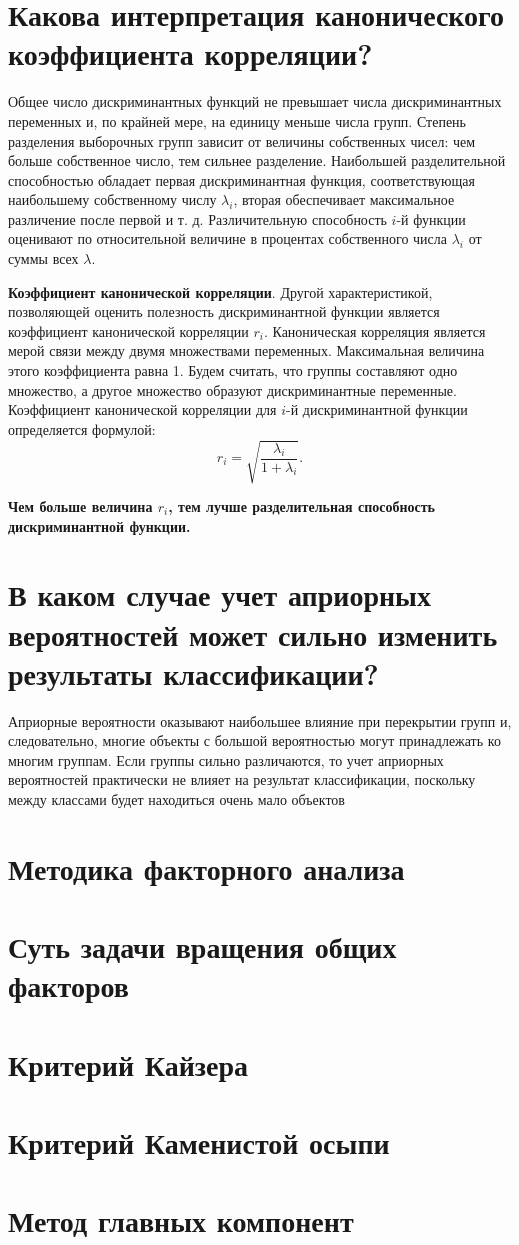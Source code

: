 \documentclass[a4paper, 12pt]{article}
\begin{document}
\section{Какова интерпретация канонического коэффициента корреляции?}
Общее число дискриминантных функций не превышает числа дискриминантных переменных и, по крайней мере, на единицу меньше числа групп. Степень разделения выборочных групп зависит от величины собственных чисел: чем больше собственное число, тем сильнее разделение. Наибольшей разделительной способностью обладает первая дискриминантная функция, соответствующая наибольшему собственному числу $\lambda_i$, вторая обеспечивает максимальное различение после первой и т. д. Различительную способность $i$-й функции оценивают по относительной величине в процентах собственного числа  $\lambda_i$ от суммы всех  $\lambda$.

\textbf{Коэффициент канонической корреляции}. Другой характеристикой, позволяющей оценить полезность дискриминантной функции является коэффициент канонической корреляции  $r_i$. Каноническая корреляция является мерой связи между двумя множествами переменных. Максимальная величина этого коэффициента равна 1. Будем считать, что группы составляют одно множество, а другое множество образуют дискриминантные переменные. Коэффициент канонической корреляции для $i$-й дискриминантной функции определяется формулой: $$r_i = \sqrt{\dfrac{\lambda_i}{1+\lambda_i}}.$$

\textbf{Чем больше величина  $r_i$, тем лучше разделительная способность дискриминантной функции.}

\section{В каком случае учет априорных вероятностей может сильно изменить результаты классификации?}
Априорные вероятности оказывают наибольшее влияние при перекрытии групп и, следовательно, многие объекты с большой вероятностью могут принадлежать ко многим группам. Если группы сильно различаются, то учет априорных вероятностей практически не влияет на результат классификации, поскольку между классами будет находиться очень мало объектов
\section{Методика факторного анализа}
\section{Суть задачи вращения общих факторов}
\section{Критерий Кайзера}
\section{Критерий Каменистой осыпи}
\section{Метод главных компонент}
\end{document}

